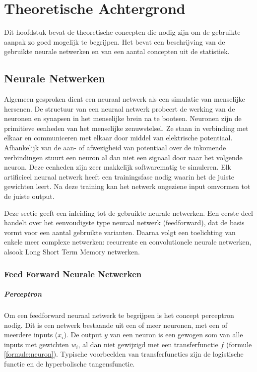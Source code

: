 \chapter{Theoretische Achtergrond}
\label{hst-theorie}
Dit hoofdstuk bevat de theoretische concepten die nodig zijn om de gebruikte aanpak zo goed mogelijk te begrijpen. Het bevat een beschrijving van de gebruikte neurale netwerken en van een aantal concepten uit de statistiek.

\section{Neurale Netwerken}
Algemeen gesproken dient een neuraal netwerk als een simulatie van menselijke hersenen. De structuur van een neuraal netwerk probeert de werking van de neuronen en synapsen in het menselijke brein na te bootsen. Neuronen zijn de primitieve eenheden van het menselijke zenuwstelsel. Ze staan in verbinding met elkaar en communiceren met elkaar door middel van elektrische potentiaal. Afhankelijk van de aan- of afwezigheid van potentiaal over de inkomende verbindingen stuurt een neuron al dan niet een signaal door naar het volgende neuron. Deze eenheden zijn zeer makkelijk softwarematig te simuleren.
Elk artificieel neuraal netwerk heeft een trainingsfase nodig waarin het de juiste gewichten leert. Na deze training kan het netwerk ongeziene input omvormen tot de juiste output.


Deze sectie geeft een inleiding tot de gebruikte neurale netwerken. Een eerste deel handelt over het eenvoudigste type neuraal netwerk (feedforward), dat de basis vormt voor een aantal gebruikte varianten. Daarna volgt een toelichting van enkele meer complexe netwerken: recurrente en convolutionele neurale netwerken, alsook Long Short Term Memory netwerken.

\subsection{Feed Forward Neurale Netwerken}
\paragraph{Perceptron} %
\label{par:perceptron}

Om een feedforward neuraal netwerk te begrijpen is het concept perceptron nodig. Dit is een netwerk bestaande uit een of meer neuronen, met een of meerdere inputs ($x_i$). De output $y$ van een neuron is een gewogen som van alle inputs met gewichten $w_i$, al dan niet gewijzigd met een transferfunctie $f$ (formule \ref{formule:neuron}). Typische voorbeelden van transferfuncties zijn de logistische functie en de hyperbolische tangensfunctie.

